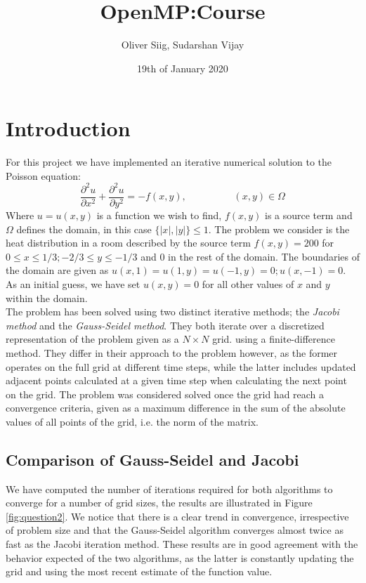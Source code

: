 \documentclass{article}
\title{OpenMP:Course}
\author{Oliver Siig, Sudarshan Vijay}
\date{19th of January 2020}
\begin{document}
\maketitle

\section{Introduction}
For this project we have implemented an iterative numerical solution to the Poisson equation:
\begin{equation}
\frac{\partial^2u}{\partial x^2}+\frac{\partial^2u}{\partial y^2}=-f(x,y),\hspace{2cm}(x,y)\in \Omega
\end{equation}
Where $u=u(x,y)$ is a function we wish to find, $f(x,y)$ is a source term and $\Omega$ defines the domain, in this case $\{|x|,|y|\}\leq 1$. The problem we consider is the heat distribution in a room described by the source term $f(x,y)=200$ for $0\leq x\leq 1/3; -2/3\leq y \leq -1/3$ and 0 in the rest of the domain. The boundaries of the domain are given as $u(x,1)=u(1,y)=u(-1,y)=0; u(x,-1)=0$. As an initial guess, we have set $u(x,y)=0$ for all other values of $x$ and $y$ within the domain.\\

The problem has been solved using two distinct iterative methods; the \emph{Jacobi method} and the \emph{Gauss-Seidel method}. They both iterate over a discretized representation of the problem given as a $N\times N$ grid. using a finite-difference method. They differ in their approach to the problem however, as the former operates on the full grid at different time steps, while the latter includes updated adjacent points calculated at a given time step when calculating the next point on the grid. The problem was considered solved once the grid had reach a convergence criteria, given as a maximum difference in the sum of the absolute values of all points of the grid, i.e. the norm of the matrix. 
\subsection{Comparison of Gauss-Seidel and Jacobi}

We have computed the number of iterations required for both algorithms to converge for a number of grid sizes, the results are illustrated in Figure \ref{fig:question2}. We notice that there is a clear trend in convergence, irrespective of problem size and that the Gauss-Seidel algorithm converges almost twice as fast as the Jacobi iteration method. These results are in good agreement with the behavior expected of the two algorithms, as the latter is constantly updating the grid and using the most recent estimate of the function value.\\
\end{document}
